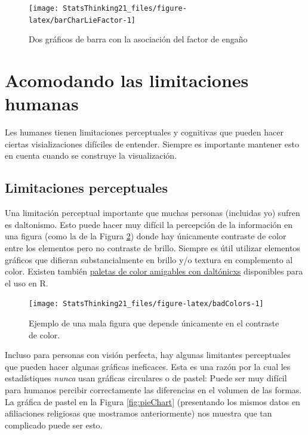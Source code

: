 \documentclass[
  12pt,
]{book}
\begin{document}
\begin{figure}
\texttt{[image: StatsThinking21\_files/figure-latex/barCharLieFactor-1]} \caption{Dos gráficos de barra con la asociación del factor de engaño }\label{fig:barCharLieFactor}
\end{figure}

\hypertarget{acomodando-las-limitaciones-humanas}{%
\section{Acomodando las limitaciones humanas}\label{acomodando-las-limitaciones-humanas}}

Les humanes tienen limitaciones perceptuales y cognitivas que pueden hacer ciertas visializaciones difíciles de entender. Siempre es importante mantener esto en cuenta cuando se construye la visualización.

\hypertarget{limitaciones-perceptuales}{%
\subsection{Limitaciones perceptuales}\label{limitaciones-perceptuales}}

Una limitación perceptual importante que muchas personas (incluidas yo) sufren es daltonismo. Esto puede hacer muy difícil la percepción de la información en una figura (como la de la Figura \ref{fig:badColors}) donde hay únicamente contraste de color entre los elementos pero no contraste de brillo. Siempre es útil utilizar elementos gráficos que difieran substancialmente en brillo y/o textura en complemento al color. Existen también \href{http://www.cookbook-r.com/Graphs/Colors_(ggplot2)/\#a-colorblind-friendly-palette}{paletas de color amigables con daltónicxs} disponibles para el uso en R.

\begin{figure}
\texttt{[image: StatsThinking21\_files/figure-latex/badColors-1]} \caption{Ejemplo de una mala figura que depende únicamente en el contraste de color.}\label{fig:badColors}
\end{figure}

Incluso para personas con visión perfecta, hay algunas limitantes perceptuales que pueden hacer algunas gráficas ineficaces. Esta es una razón por la cual les estadístiques \emph{nunca} usan gráficas circulares o de pastel: Puede ser muy difícil para humanos percibir correctamente las diferencias en el volumen de las formas. La gráfica de pastel en la Figura \ref{fig:pieChart} (presentando los mismos datos en afiliaciones religiosas que mostramos anteriormente) nos muestra que tan complicado puede ser esto.
\end{document}

